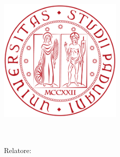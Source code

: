 \begin{titlepage}
	\begin{addmargin}[-1cm]{-3cm}
    \begin{center}
        \large  

        \hfill

        \vfill

        \begingroup
            \color{Maroon}\spacedallcaps{\myTitle} \\ \bigskip
        \endgroup

        \spacedlowsmallcaps{\myName}

        \vfill

        \includegraphics[width=6cm]{images/pdf/logo_unipd.pdf} \\ \medskip

        \myDepartment \\                            
        \myUni \\ \bigskip
        Relatore: \myProf

        \myTime\ 

        \vfill                      

    \end{center}  
  \end{addmargin}       
\end{titlepage}   
